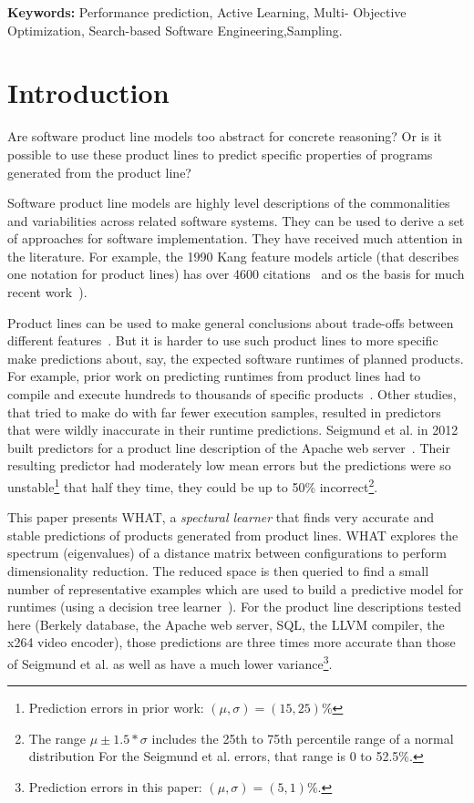 \documentclass{sig-alternative}
\begin{document}
{\bf Keywords:} Performance prediction, Active Learning, 
Multi- Objective Optimization,
Search-based Software Engineering,Sampling.
 

 
\section{Introduction}
 
 Are software  product line models too abstract for concrete reasoning?
Or is it possible to use these product lines to predict specific properties 
of programs generated from the product line? 

Software product line models are highly level descriptions of the commonalities and variabilities   across related software systems. They can be used to derive a set of approaches for software implementation. 
They have received much attention in the literature.
For example, the 1990 Kang feature models article (that describes one notation for product lines) has over 4600 citations~\cite{kang1990feature} and os the basis for 
much recent work~\cite{lopez15,harman14,sayyad13a,sayyad13b}).

 Product lines can be used to make general conclusions about trade-offs between different features~\cite{sayyad13a,sayyad13b}. 
But it is harder to use
such product lines to more specific make
predictions about, say, the expected software runtimes of planned products. 
For example, prior work on predicting runtimes from product lines had  to compile and execute
hundreds to thousands of specific products~\cite{guo2013variability}. 
Other studies, that tried to make do with   far fewer execution samples, resulted
in predictors that were
 wildly inaccurate in their runtime predictions.
Seigmund et al. in 2012 built predictors for a product line description of the Apache web server~\cite{siegmund2012predicting}. Their resulting predictor had moderately low mean errors   but the predictions
 were  so  unstable\footnote{Prediction errors in prior  work: $(\mu,\sigma)=(15,25)$\%} that half they time, they could be up to 50\% incorrect\footnote{
 The range  $\mu \pm 1.5*\sigma$  includes the
 25th to 75th percentile range of a normal distribution   
For the Seigmund et al. errors, that range is  0 to 52.5\%.}.
 

This paper presents WHAT, a {\em spectural learner}     that finds very
accurate and  stable predictions of products generated from  product lines.
WHAT explores the spectrum (eigenvalues) of a distance matrix
between  configurations to perform dimensionality reduction. The reduced
space is then queried to find a small number of representative examples which are used to
build a predictive model for runtimes (using a decision tree learner~\cite{breiman1984}).
For the product line descriptions tested here (Berkely database, the Apache web server, SQL, the LLVM compiler, the x264 video encoder),
those predictions are three times more accurate than those of Seigmund et al. as well
as have a much lower variance\footnote{Prediction errors in this paper: $(\mu,\sigma) = (5,1)$\%.}.
\end{document}
